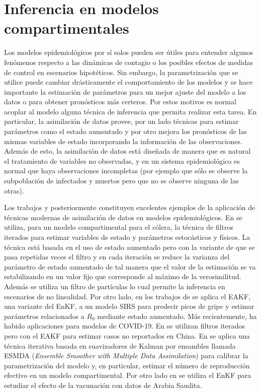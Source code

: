 \section{Inferencia en modelos compartimentales}

Los modelos epidemiológicos por sí solos pueden ser útiles para entender algunos fenómenos respecto a las dinámicas de contagio o los posibles efectos de medidas de control en escenarios hipotéticos. Sin embargo, la parametrización que se utilice puede cambiar drásticamente el comportamiento de los modelos y se hace importante la estimación de parámetros para un mejor ajuste del modelo a los datos o para obtener pronósticos más certeros. Por estos motivos es normal acoplar al modelo alguna técnica de inferencia que permita realizar esta tarea. En particular, la asimilación de datos provee, por un lado técnicas para estimar parámetros como el estado aumentado y por otro mejora los pronósticos de las mismas variables de estado incorporando la información de las observaciones. Además de esto, la asimilación de datos está diseñada de manera que es natural el tratamiento de variables no observadas, y en un sistema epidemiológico es normal que haya observaciones incompletas (por ejemplo que sólo se observe la subpoblación de infectados y muertos pero que no se observe ninguna de las otras). 

Los trabajos \cite{Ionides2006} y posteriormente \cite{Shaman2012, Shaman2013} constituyen excelentes ejemplos de la aplicación de técnicas modernas de asimilación de datos en modelos epidemiológicos. En \cite{Ionides2006} se utiliza, para un modelo compartimental para el cólera, la técnica de filtros iterados para estimar variables de estado y parámetros estocásticos y físicos. La técnica está basada en el uso de estado aumentado pero con la variante de que se pasa repetidas veces el filtro y en cada iteración se reduce la varianza del parámetro de estado aumentado de tal manera que el valor de la estimación se va estabilizando en un valor fijo que corresponde al máximo de la verosimilitud. Además se utiliza un filtro de partículas lo cual permite la inferencia en escenarios de no linealidad. Por otro lado, en los trabajos de \cite{Shaman2012, Shaman2013} se aplica el EAKF, una variante del EnKF, a un modelo SIRS para predecir picos de gripe y estimar parámetros relacionados a $R_0$ mediante estado aumentado. Más recientemente, ha habido aplicaciones para modelos de COVID-19. En \cite{Li2020} se utilizan filtros iterados pero con el EAKF para estimar casos no reportados en China. En \cite{Evensen2020} se aplica una técnica iterativa basada en suavizadores de Kalman por ensambles llamada ESMDA (\textit{Ensemble Smoother with Multiple Data Assimilation}) para calibrar la parametrización del modelo y, en particular, estimar el número de reproducción efectivo en un modelo compartimental. Por otro lado en \cite{Ghostine2021} se utiliza el EnKF para estudiar el efecto de la vacunación con datos de Arabia Saudita.


